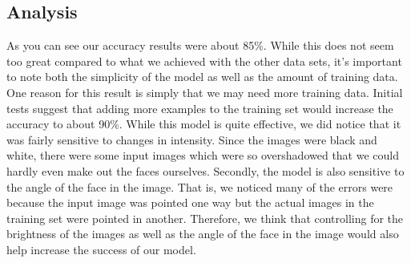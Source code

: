 \documentclass[letterpaper, 11pt, conference]{ieeeconf}
\begin{document}
\subsection{Analysis}

As you can see our accuracy results were about 85\%. While this does not seem
too great compared to what we achieved with the other data sets, it's important to
note both the simplicity of the model as well as the amount of training data.
One reason for this result is simply that we may need more training data.
Initial tests suggest that adding more examples to the training set would
increase the accuracy to about 90\%. While this model is quite effective, we did
notice that it was fairly sensitive to changes in intensity. Since the images
were black and white, there were some input images which were so overshadowed
that we could hardly even make out the faces ourselves. Secondly, the model is
also sensitive to the angle of the face in the image. That is, we noticed many
of the errors were because the input image was pointed one way but the actual
images in the training set were pointed in another. Therefore, we think that
controlling for the brightness of the images as well as the angle of the face
in the image would also help increase the success of our model.



\end{document}
